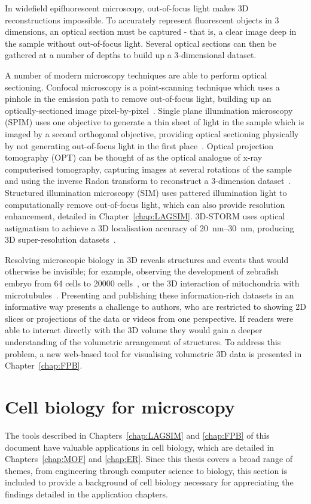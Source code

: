 In widefield epifluorescent microscopy, out-of-focus light makes 3D reconstructions impossible.
To accurately represent fluorescent objects in 3 dimensions, an optical section must be captured - that is, a clear image deep in the sample without out-of-focus light. %
Several optical sections can then be gathered at a number of depths to build up a 3-dimensional dataset. 

A number of modern microscopy techniques are able to perform optical sectioning. 
Confocal microscopy is a point-scanning technique which uses a pinhole in the emission path to remove out-of-focus light, building up an optically-sectioned image pixel-by-pixel~\cite{white1987evaluation, marvin1961microscopy}. 
Single plane illumination microscopy (SPIM) uses one objective to generate a thin sheet of light in the sample which is imaged by a second orthogonal objective, providing optical sectioning physically by not generating out-of-focus light in the first place~\cite{huisken2004optical}. 
Optical projection tomography (OPT) can be thought of as the optical analogue of x-ray computerised tomography, capturing images at several rotations of the sample and using the inverse Radon transform to reconstruct a 3-dimension dataset~\cite{sharpe2002optical}. 
Structured illumination microscopy (SIM) uses pattered illumination light to computationally remove out-of-focus light, which can also provide resolution enhancement, detailed in Chapter~\ref{chap:LAGSIM}. 
3D-STORM uses optical astigmatism to achieve a 3D localisation accuracy of \SIrange{20}{30}{\nano\metre}, producing 3D super-resolution datasets~\cite{huang2008three}. 

Resolving microscopic biology in 3D reveals structures and events that would otherwise be invisible; for example, observing the development of zebrafish embryo from 64 cells to \num{20000} cells~\cite{keller2008reconstruction}, or the 3D interaction of mitochondria with microtubules~\cite{huang2016ultra}. 
Presenting and publishing these information-rich datasets in an informative way presents a challenge to authors, who are restricted to showing 2D slices or projections of the data or videos from one perspective. 
If readers were able to interact directly with the 3D volume they  would gain a deeper understanding of the volumetric arrangement of structures. 
To address this problem, a new web-based tool for visualising volumetric 3D data is presented in Chapter~\ref{chap:FPB}. 


\section{Cell biology for microscopy}
The tools described in Chapters~\ref{chap:LAGSIM} and \ref{chap:FPB} of this document have valuable applications in cell biology, which are detailed in Chapters~\ref{chap:MOF} and \ref{chap:ER}.
Since this thesis covers a broad range of themes, from engineering through computer science to biology, this section is included to provide a background of cell biology necessary for appreciating the findings detailed in the application chapters. 

